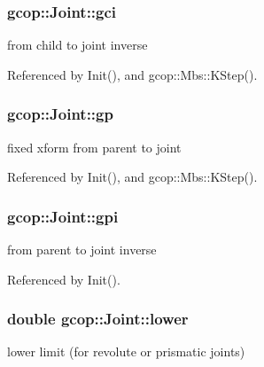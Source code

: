 \subsubsection[{gci}]{ {\bf gcop\-::\-Joint\-::gci}}\label{classgcop_1_1Joint_a6450f6d8290e6eabe5c8155335a3da40}


from child to joint inverse 



\-Referenced by \-Init(), and gcop\-::\-Mbs\-::\-K\-Step().

\subsubsection[{gp}]{ {\bf gcop\-::\-Joint\-::gp}}\label{classgcop_1_1Joint_a49945d837def8ab298ae1005dd7c58c1}


fixed xform from parent to joint 



\-Referenced by \-Init(), and gcop\-::\-Mbs\-::\-K\-Step().

\subsubsection[{gpi}]{ {\bf gcop\-::\-Joint\-::gpi}}\label{classgcop_1_1Joint_aef47b35befb349f6607097469711b680}


from parent to joint inverse 



\-Referenced by \-Init().

\subsubsection[{lower}]{\setlength{\rightskip}{0pt plus 5cm}double {\bf gcop\-::\-Joint\-::lower}}\label{classgcop_1_1Joint_a62dbb35aeea978593681a35ab032ed04}


lower limit (for revolute or prismatic joints) 

